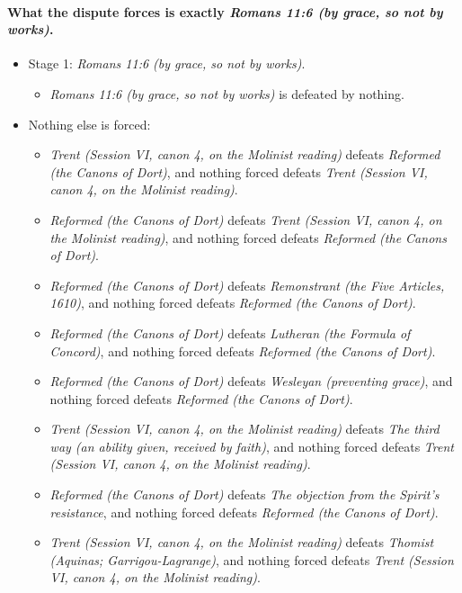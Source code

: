 \documentclass[11pt]{article}
\begin{document}
\paragraph{What the dispute forces is exactly \emph{Romans 11:6 (by grace, so not by works)}.}
\begin{itemize}
\item Stage 1: \emph{Romans 11:6 (by grace, so not by works)}.
\begin{itemize}
\item \emph{Romans 11:6 (by grace, so not by works)} is defeated by nothing.
\end{itemize}
\item Nothing else is forced:
\begin{itemize}
\item \emph{Trent (Session VI, canon 4, on the Molinist reading)} defeats \emph{Reformed (the Canons of Dort)}, and nothing forced defeats \emph{Trent (Session VI, canon 4, on the Molinist reading)}.
\item \emph{Reformed (the Canons of Dort)} defeats \emph{Trent (Session VI, canon 4, on the Molinist reading)}, and nothing forced defeats \emph{Reformed (the Canons of Dort)}.
\item \emph{Reformed (the Canons of Dort)} defeats \emph{Remonstrant (the Five Articles, 1610)}, and nothing forced defeats \emph{Reformed (the Canons of Dort)}.
\item \emph{Reformed (the Canons of Dort)} defeats \emph{Lutheran (the Formula of Concord)}, and nothing forced defeats \emph{Reformed (the Canons of Dort)}.
\item \emph{Reformed (the Canons of Dort)} defeats \emph{Wesleyan (preventing grace)}, and nothing forced defeats \emph{Reformed (the Canons of Dort)}.
\item \emph{Trent (Session VI, canon 4, on the Molinist reading)} defeats \emph{The third way (an ability given, received by faith)}, and nothing forced defeats \emph{Trent (Session VI, canon 4, on the Molinist reading)}.
\item \emph{Reformed (the Canons of Dort)} defeats \emph{The objection from the Spirit’s resistance}, and nothing forced defeats \emph{Reformed (the Canons of Dort)}.
\item \emph{Trent (Session VI, canon 4, on the Molinist reading)} defeats \emph{Thomist (Aquinas; Garrigou-Lagrange)}, and nothing forced defeats \emph{Trent (Session VI, canon 4, on the Molinist reading)}.
\end{itemize}
\end{itemize}
\end{document}
